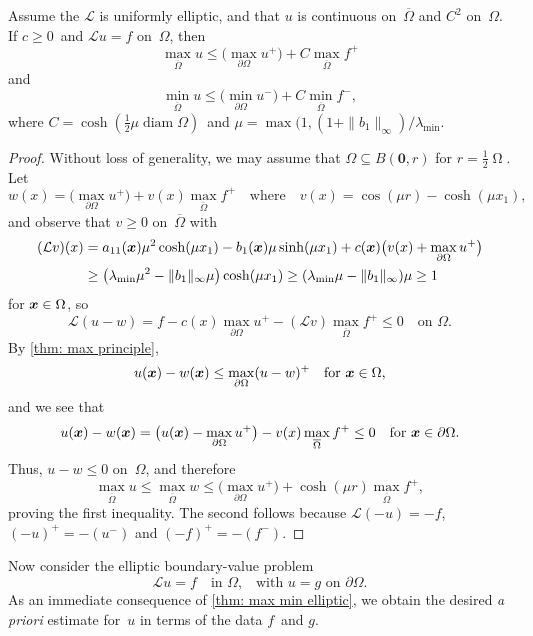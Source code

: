\begin{theorem}\label{thm: max min elliptic}
Assume the $\mathcal{L}$ is uniformly elliptic, and that $u$ is continuous 
on~$\overline{\Omega}$ and $C^2$ on~$\Omega$.  If $c\ge0$~and 
$\mathcal{L}u=f$ on~$\Omega$, then
\[
\max_{\overline{\Omega}}u\le\bigl(\max_{\partial\Omega}u^+\bigr)
	+C\max_{\overline{\Omega}}f^+
\]
and
\[
\min_{\overline{\Omega}}u\le\bigl(\min_{\partial\Omega}u^-\bigr)
	+C\min_{\overline{\Omega}}f^-,
\]
where $C=\cosh(\tfrac12\mu\operatorname{diam}\Omega)$~and 
$\mu=\max(1, (1+\|b_1\|_\infty)/\lambda_{\min}$.
\end{theorem}
\begin{proof}
Without loss of generality, we may assume that
$\Omega\subseteq B(\boldsymbol{0},r)$ for $r=\tfrac12\operatorname\Omega$.
Let
\[
w(x)=\bigl(\max_{\partial\Omega}u^+\bigr)+v(x)\max_{\overline{\Omega}}f^+
\quad\text{where}\quad
v(x)=\cos(\mu r)-\cosh(\mu x_1),
\]
and observe that $v\ge0$ on~$\overline{\Omega}$ with
\begin{align*}
(\mathcal{L}v)(x)&=a_{11}(\boldsymbol{x})\mu^2\cosh(\mu x_1)-b_1(\boldsymbol{x})\mu\sinh(\mu x_1)
	+c(\boldsymbol{x})\bigl(v(x)+\max_{\partial\Omega}u^+\bigr)\\
	&\ge\bigl(\lambda_{\min}\mu^2-\|b_1\|_\infty\mu\bigr)\cosh(\mu x_1)
	\ge(\lambda_{\min}\mu-\|b_1\|_\infty)\mu\ge1
\end{align*}
for $\boldsymbol{x}\in\Omega$, so
\[
\mathcal{L}(u-w)=f-c(x)\max_{\partial\Omega}u^+
	-(\mathcal{L}v)\max_{\overline{\Omega}}f^+\le0
\quad\text{on $\Omega$.}
\]
By \cref{thm: max principle},
\[
u(\boldsymbol{x})-w(\boldsymbol{x})\le\max_{\partial\Omega}(u-w)^+\quad\text{for $\boldsymbol{x}\in\Omega$,}
\]
and we see that
\[
u(\boldsymbol{x})-w(\boldsymbol{x})=\bigl(u(\boldsymbol{x})-\max_{\partial\Omega}u^+\bigr)
	-v(x)\max_{\overline{\Omega}}f^+\le0
	\quad\text{for $\boldsymbol{x}\in\partial\Omega$.}
\]
Thus, $u-w\le0$ on~$\Omega$, and therefore
\[
\max_{\overline{\Omega}}u\le\max_{\overline{\Omega}}w
	\le\bigl(\max_{\partial\Omega}u^+\bigr)
	+\cosh(\mu r)\max_{\overline{\Omega}}f^+,
\]
proving the first inequality.  The second follows because 
$\mathcal{L}(-u)=-f$, $(-u)^+=-(u^-)$ and $(-f)^+=-(f^-)$.
\end{proof}

Now consider the elliptic boundary-value problem
\begin{equation}\label{eq: Dirichlet problem L}
\mathcal{L}u=f\quad\text{in $\Omega$,}
	\quad\text{with $u=g$ on $\partial\Omega$.}
\end{equation}
As an immediate consequence of \cref{thm: max min elliptic}, we obtain
the desired \emph{a priori} estimate for~$u$ in terms of the data $f$~and $g$.


